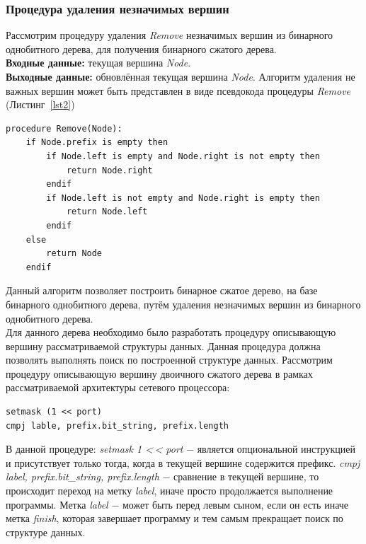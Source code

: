 \documentclass[conference]{IEEEtran}
\begin{document}
            \subsubsection{Процедура удаления незначимых вершин}
                Рассмотрим процедуру удаления \emph{Remove} незначимых вершин из бинарного однобитного дерева, для получения бинарного сжатого дерева.\\
                {\bf Входные данные:} текущая вершина \emph{Node}.\\
                {\bf Выходные данные:} обновлённая текущая вершина \emph{Node}.
                Алгоритм удаления не важных вершин может быть представлен в виде псевдокода процедуры \emph{Remove} (Листинг~\ref{lst2})
\\
\begin{center} 
\begin{lstlisting}[caption=Процедура удаления незначимых вершин., label=lst2]
procedure Remove(Node):
    if Node.prefix is empty then
        if Node.left is empty and Node.right is not empty then
            return Node.right
        endif
        if Node.left is not empty and Node.right is empty then
            return Node.left
        endif
    else
        return Node
    endif
\end{lstlisting}
\end{center}
\vspace{1em}
            Данный алгоритм позволяет построить бинарное сжатое дерево, на базе бинарного однобитного дерева, путём удаления незначимых вершин из бинарного однобитного дерева.\\
            Для данного дерева необходимо было разработать процедуру описывающую вершину рассматриваемой структуры данных. Данная процедура должна позволять выполнять
            поиск по построенной структуре данных.
            Рассмотрим процедуру описывающую вершину двоичного сжатого дерева в рамках рассматриваемой архитектуры сетевого процессора:
\\
\begin{lstlisting}[caption=Процедура описывающая вершину бинарном сжатом дереве.]
setmask (1 << port)
cmpj lable, prefix.bit_string, prefix.length
\end{lstlisting}
\vspace{1em}
            В данной процедуре: 
            \emph{setmask 1 <\,< port} $-$ является опциональной инструкцией и присутствует только тогда, когда в текущей вершине содержится префикс.
            \emph{cmpj label, prefix.bit\_string, prefix.length} $-$ сравнение в текущей вершине, то происходит переход на метку \emph{label}, иначе просто продолжается выполнение программы.
            Метка \emph{label} $-$ может быть перед левым сыном, если он есть иначе метка \emph{finish}, 
            которая завершает программу и тем самым прекращает поиск по структуре данных.
\end{document}
